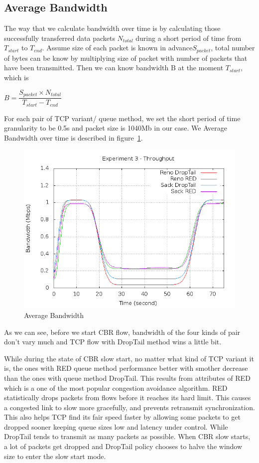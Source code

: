 \documentclass[10pt, conference]{lib/IEEEtran}
\begin{document}
\subsection{Average Bandwidth}
The way that we calculate bandwidth over time is by calculating those successfully transferred data packets $N_{total}$ during a short period of time from $T_{start}$ to $T_{end}$. Assume size of each packet is known in advance$S_{packet}$, total number of bytes can be know by multiplying size of packet with number of packets that have been transmitted. Then we can know bandwidth B at the moment $T_{start}$, which is  
\begin{center}
    $B = \dfrac{S_{packet} \times N_{total}}{T_{start} - T_{end}}$
\end{center}
For each pair of TCP variant/ queue method, we set the short period of time granularity to be 0.5s and packet size is 1040Mb in our case. We Average Bandwidth over time is described in figure~\ref{fig:exp3-thp}.\\
\begin{figure}[!htb]
    \centering
    \includegraphics[width=0.9\linewidth]{plot/exp3-thp.png}
    \caption{Average Bandwidth}
    \label{fig:exp3-thp}
\end{figure}

As we can see, before we start CBR flow, bandwidth of the four kinds of pair don't vary much and TCP flow with DropTail method wins a little bit.

While during the state of CBR slow start, no matter what kind of TCP variant it is, the ones with RED queue method performance better with smother decrease than the ones with queue method DropTail. This results from attributes of RED which is a one of the most popular congestion avoidance algorithm. RED statistically drops packets from flows before it reaches its hard limit. This causes a congested link to slow more gracefully, and prevents retransmit synchronization. This also helps TCP find its fair speed faster by allowing some packets to get dropped sooner keeping queue sizes low and latency under control. While DropTail tends to transmit as many packets as possible. When CBR slow starts, a lot of packets get dropped and DropTail policy chooses to halve the window size to enter the slow start mode.
\end{document}
